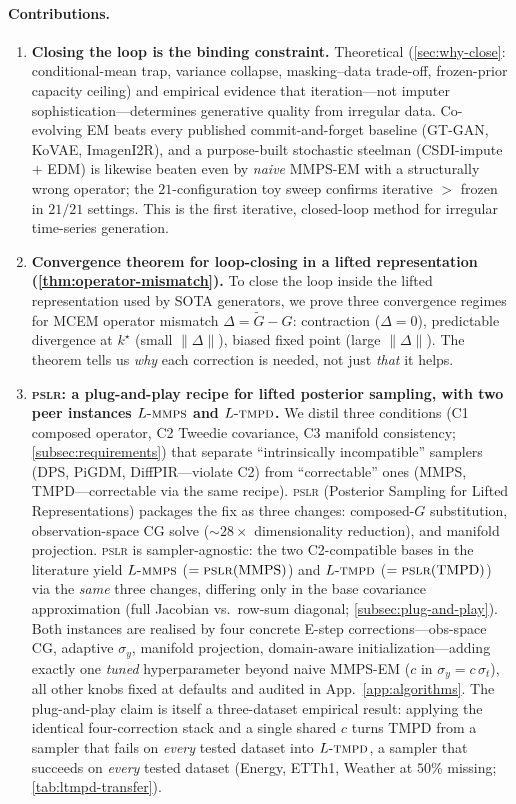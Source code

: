 \documentclass{article}
\theoremstyle{plain}
\theoremstyle{definition}
\theoremstyle{remark}
\newcommand{\pslr}{\textsc{pslr}}
\newcommand{\lmmps}{L\mbox{-}\textsc{mmps}}
\newcommand{\ltmpd}{L\mbox{-}\textsc{tmpd}}
\begin{document}
\paragraph{Contributions.}
\begin{enumerate}
\setlength{\itemsep}{0pt}
\item \textbf{Closing the loop is the binding constraint.} Theoretical (\cref{sec:why-close}: conditional-mean trap, variance collapse, masking--data trade-off, frozen-prior capacity ceiling) and empirical evidence that iteration---not imputer sophistication---determines generative quality from irregular data. Co-evolving EM beats every published commit-and-forget baseline (GT-GAN, KoVAE, ImagenI2R), and a purpose-built stochastic steelman (CSDI-impute $+$ EDM) is likewise beaten even by \emph{naive} MMPS-EM with a structurally wrong operator; the $21$-configuration toy sweep confirms iterative $>$ frozen in $21/21$ settings. This is the first iterative, closed-loop method for irregular time-series generation.
\item \textbf{Convergence theorem for loop-closing in a lifted representation (\cref{thm:operator-mismatch}).} To close the loop inside the lifted representation used by SOTA generators, we prove three convergence regimes for MCEM operator mismatch $\Delta = \tilde{G} - G$: contraction ($\Delta = 0$), predictable divergence at $k^\star$ (small $\|\Delta\|$), biased fixed point (large $\|\Delta\|$). The theorem tells us \emph{why} each correction is needed, not just \emph{that} it helps.
\item \textbf{\pslr{}: a plug-and-play recipe for lifted posterior sampling, with two peer instances $\lmmps$ and $\ltmpd$.} We distil three conditions (C1 composed operator, C2 Tweedie covariance, C3 manifold consistency; \cref{subsec:requirements}) that separate ``intrinsically incompatible'' samplers (DPS, PiGDM, DiffPIR---violate C2) from ``correctable'' ones (MMPS, TMPD---correctable via the same recipe). \pslr{} (Posterior Sampling for Lifted Representations) packages the fix as three changes: composed-$G$ substitution, observation-space CG solve ($\sim 28\times$ dimensionality reduction), and manifold projection. \pslr{} is sampler-agnostic: the two C2-compatible bases in the literature yield $\lmmps$ ($=\pslr{}(\mathrm{MMPS})$) and $\ltmpd$ ($=\pslr{}(\mathrm{TMPD})$) via the \emph{same} three changes, differing only in the base covariance approximation (full Jacobian vs.\ row-sum diagonal; \cref{subsec:plug-and-play}). Both instances are realised by four concrete E-step corrections---obs-space CG, adaptive $\sigma_y$, manifold projection, domain-aware initialization---adding exactly one \emph{tuned} hyperparameter beyond naive MMPS-EM ($c$ in $\sigma_y = c\,\sigma_t$), all other knobs fixed at defaults and audited in App.~\ref{app:algorithms}. The plug-and-play claim is itself a three-dataset empirical result: applying the identical four-correction stack and a single shared $c$ turns TMPD from a sampler that fails on \emph{every} tested dataset into $\ltmpd$, a sampler that succeeds on \emph{every} tested dataset (Energy, ETTh1, Weather at $50\%$ missing; \cref{tab:ltmpd-transfer}).

\end{enumerate}
\end{document}
